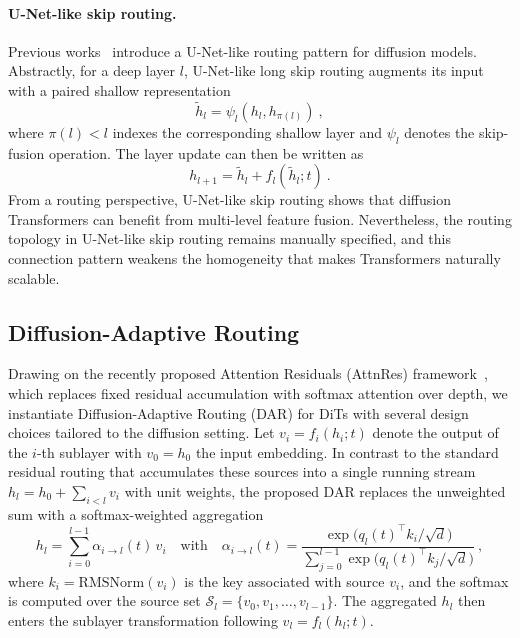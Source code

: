 \documentclass[]{ant_tech_report}
\begin{document}
\paragraph{U-Net-like skip routing.}
Previous works~\citep{bao2023all,tian2024u,chen2025towards,li2024hunyuandit} introduce a U-Net-like routing pattern for diffusion models. Abstractly, for a deep layer $l$, U-Net-like long skip routing augments its input with a paired shallow representation
\begin{equation}
    \tilde{h}_l = \psi_l\left(h_{l}, h_{\pi(l)}\right) \ ,
\end{equation}
where $\pi(l) < l$ indexes the corresponding shallow layer and $\psi_l$ denotes the skip-fusion operation. The layer update can then be written as
\begin{equation}
    h_{l+1} = \tilde{h}_l + f_l(\tilde{h}_l; t) \ .
\end{equation}
From a routing perspective, U-Net-like skip routing shows that diffusion Transformers can benefit from multi-level feature fusion. Nevertheless, the routing topology in U-Net-like skip routing remains manually specified, and this connection pattern weakens the homogeneity that makes Transformers naturally scalable.

\subsection{Diffusion-Adaptive Routing}
\label{sec:DAR}

Drawing on the recently proposed Attention Residuals (AttnRes) framework~\citep{team2026attention}, which replaces fixed residual accumulation with softmax attention over depth, we instantiate Diffusion-Adaptive Routing (\textsc{DAR}) for DiTs with several design choices tailored to the diffusion setting. Let $v_i = f_i(h_i; t)$ denote the output of the $i$-th sublayer with $v_0 = h_0$ the input embedding. In contrast to the standard residual routing that accumulates these sources into a single running stream $h_l = h_0 + \sum_{i<l} v_i$ with unit weights, the proposed \textsc{DAR} replaces the unweighted sum with a softmax-weighted aggregation
\begin{equation} 
    h_l = \sum_{i=0}^{l-1} \alpha_{i \to l}(t)\, v_i 
    \quad\text{with}\quad
    \alpha_{i \to l}(t) = \frac{\exp\bigl(q_l(t)^{\top} k_i / \sqrt{d}\bigr)}{\sum_{j=0}^{l-1} \exp\bigl(q_l(t)^{\top} k_j / \sqrt{d}\bigr)} \ ,
\end{equation}
where $k_i = \mathrm{RMSNorm}(v_i)$ is the key associated with source $v_i$, and the softmax is computed over the source set $\mathcal{S}_l = \{v_0, v_1, \ldots, v_{l-1}\}$. The aggregated $h_l$ then enters the sublayer transformation following $v_l = f_l(h_l; t)$.
\end{document}
